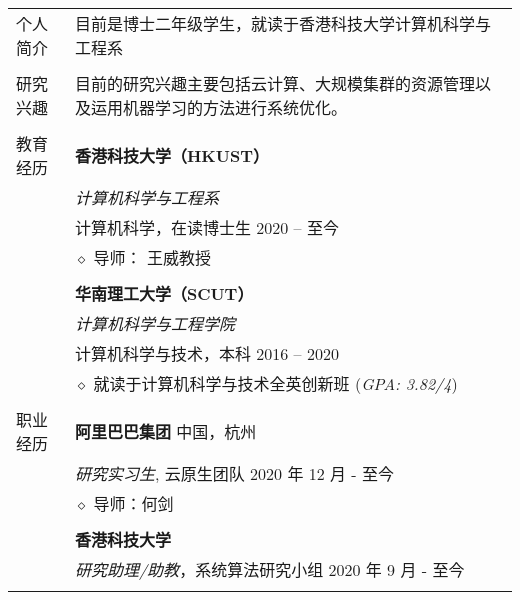 \documentclass[letterpaper, 11pt]{article}
\begin{document}
\begin{longtable}{p{1.3in}p{4.8in}}

{个人简介}
& 目前是博士二年级学生，就读于香港科技大学计算机科学与工程系 \\
& \\

\nohyphens{研究兴趣}
& 目前的研究兴趣主要包括云计算、大规模集群的资源管理以及运用机器学习的方法进行系统优化。 \\
& \\

{教育经历}
& \textbf{香港科技大学（HKUST）} \\
& \textit{计算机科学与工程系} \\
& 计算机科学，在读博士生 \hfill 2020 -- 至今 \\
& $\diamond$ 导师： 王威教授 \\
& \\

& \textbf{华南理工大学（SCUT）} \\
& \textit{计算机科学与工程学院} \\
& 计算机科学与技术，本科 \hfill 2016 -- 2020 \\
& $\diamond$ 就读于计算机科学与技术全英创新班 ({\it GPA: 3.82/4}) \\
& \\


{职业经历}
& {\textbf{阿里巴巴集团}} \hfill 中国，杭州 \\
& \textit{研究实习生}, 云原生团队 \hfill 2020 年 12 月 - 至今 \\
& $\diamond$ 导师：何剑 \\
& \\

& {\textbf{香港科技大学}} \\
& \textit{研究助理/助教}，系统算法研究小组 \hfill 2020 年 9 月 - 至今 \\
& \\
 

\end{longtable}
\end{document}
